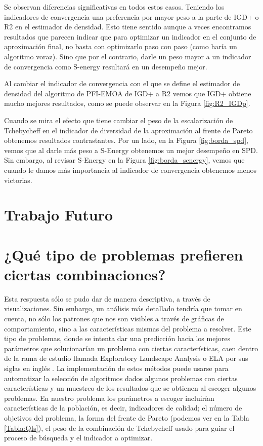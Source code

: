 Se observan diferencias significativas en todos estos casos. Teniendo los indicadores de convergencia una preferencia por mayor peso a la parte de IGD+ o R2 en el estimador de densidad. Esto tiene sentido aunque a veces encontramos resultados que parecen indicar que para optimizar un indicador en el conjunto de aproximación final, no basta con optimizarlo paso con paso (como haría un algoritmo voraz). Sino que por el contrario, darle un peso mayor a un indicador de convergencia como S-energy resultará en un desempeño mejor.

Al cambiar el indicador de convergencia con el que se define el estimador de densidad del algoritmo de PFI-EMOA \cite{PFI} de IGD+ a R2 vemos que IGD+ obtiene mucho mejores resultados, como se puede observar en la Figura \ref{fig:R2_IGDp}.

Cuando se mira el efecto que tiene cambiar el peso de la escalarización de Tchebycheff en el indicador de diversidad de la aproximación al frente de Pareto obtenemos resultados contrastantes. Por un lado, en la Figura \ref{fig:borda_spd}, vemos que al darle más peso a S-Energy obtenemos un mejor desempeño en SPD. Sin embargo, al revisar S-Energy en la Figura \ref{fig:borda_senergy}, vemos que cuando le damos más importancia al indicador de convergencia obtenemos menos victorias.

\section{Trabajo Futuro}
\section*{¿Qué tipo de problemas prefieren ciertas combinaciones?}
Esta respuesta sólo se pudo dar de manera descriptiva, a través de visualizaciones. Sin embargo, un análisis más detallado tendría que tomar en cuenta, no sólo los patrones que nos son visibles a través de gráficas de comportamiento, sino a las características mismas del problema a resolver. Este tipo de problemas, donde se intenta dar una predicción hacia los mejores parámetros que solucionarían un problema con ciertas características, caen dentro de la rama de estudio llamada Exploratory Landscape Analysis o ELA por sus siglas en inglés \cite{trajanovExplainableLandscapeAnalysis2022}. La implementación de estos métodos puede usarse para automatizar la selección de algoritmos dados algunos problemas con ciertas características y un muestreo de los resultados que se obtienen al escoger algunos problemas. En nuestro problema los parámetros a escoger incluirían características de la población, es decir, indicadores de calidad; el número de objetivos del problema, la forma del frente de Pareto (podemos ver en la Tabla \ref{Tabla:QIs}), el peso de la combinación de Tchebycheff usado para guiar el proceso de búsqueda y el indicador a optimizar. 

